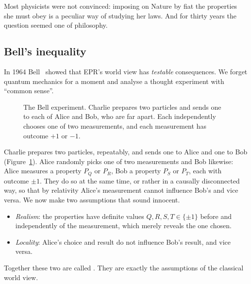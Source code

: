 Most physicists were not convinced: imposing on Nature by fiat the properties she must obey is a peculiar way of studying her laws. And for thirty years the question seemed one of philosophy.

\subsection{Bell's inequality}

In 1964 Bell~\cite{bell1964} showed that EPR's world view has \emph{testable} consequences. We forget quantum mechanics for a moment and analyse a thought experiment with ``common sense''.

\begin{figure}[htb]
  \centering
  \caption{The Bell experiment. Charlie prepares two particles and sends one to each of Alice and Bob, who are far apart. Each independently chooses one of two measurements, and each measurement has outcome $+1$ or $-1$.}
  \label{fig:bell-setup}
\end{figure}

Charlie prepares two particles, repeatably, and sends one to Alice and one to Bob (Figure~\ref{fig:bell-setup}). Alice randomly picks one of two measurements and Bob likewise: Alice measures a property $P_Q$ or $P_R$, Bob a property $P_S$ or $P_T$, each with outcome $\pm1$.
They do so at the same time, or rather in a causally disconnected way, so that by relativity Alice's measurement cannot influence Bob's and vice versa. We now make two assumptions that sound innocent.

\begin{itemize}
  \item \emph{Realism}: the properties have definite values $Q,R,S,T\in\{\pm1\}$ before and independently of the measurement, which merely reveals the one chosen.
  \item \emph{Locality}: Alice's choice and result do not influence Bob's result, and vice versa.
\end{itemize}
Together these two are called . They are exactly the assumptions of the classical world view.

